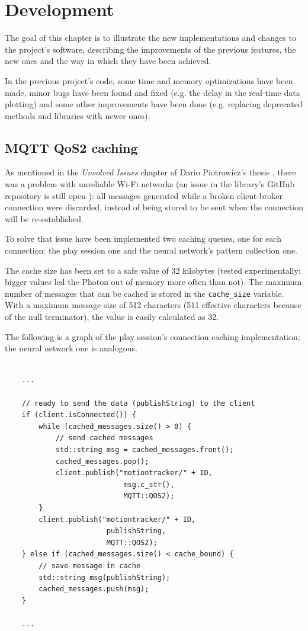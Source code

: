 \chapter{Development}
The goal of this chapter is to illustrate the new implementations and changes to the project's software, describing the improvements of the previous features, the new ones and the way in which they have been achieved.
\bigbreak

In the previous project's code, some time and memory optimizations have been made, minor bugs have been found and fixed (e.g. the delay in the real-time data plotting) and some other improvements have been done (e.g. replacing deprecated methods and libraries with newer ones).

\section{MQTT QoS2 caching}
As mentioned in the \textit{Unsolved Issues} chapter of Dario Piotrowicz's thesis \cite{Pio19}, there was a problem with unreliable Wi-Fi networks (an issue in the library's GitHub repository is still open \cite{githubQos2Issue}): all messages generated while a broken client-broker connection were discarded, instead of being stored to be sent when the connection will be re-established.

To solve that issue have been implemented two caching queues, one for each connection: the play session one and the neural network's pattern collection one.

The cache size has been set to a safe value of 32 kilobytes (tested experimentally: bigger values led the Photon out of memory more often than not). The maximum number of messages that can be cached is stored in the \texttt{cache\_size} variable. With a maximum message size of 512 characters (511 effective characters because of the null terminator), the value is easily calculated as 32.

The following is a graph of the play session's connection caching implementation; the neural network one is analogous.
\bigbreak

\begin{lstlisting}[style=CPPStyle]

	...

	// ready to send the data (publishString) to the client
	if (client.isConnected()) {
        while (cached_messages.size() > 0) {
			// send cached messages
            std::string msg = cached_messages.front();
            cached_messages.pop();
			client.publish("motiontracker/" + ID,
							msg.c_str(),
							MQTT::QOS2);
        }
		client.publish("motiontracker/" + ID,
						publishString,
						MQTT::QOS2);
    } else if (cached_messages.size() < cache_bound) {
		// save message in cache
        std::string msg(publishString);
        cached_messages.push(msg);
    }

	...

\end{lstlisting}
\bigbreak

